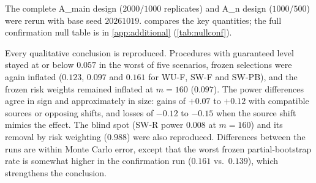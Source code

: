 The complete A\_main design ($2000$/$1000$ replicates) and A\_n design ($1000$/$500$) were rerun with base seed $20261019$.  compares the key quantities; the full confirmation null table is in \cref{app:additional} (\cref{tab:nullconf}).

\begin{table}[H]
\centering\scriptsize
\caption{Key quantities in the exploratory and the independent confirmation runs, with Wilson 95\% intervals (rates) or paired normal 95\% intervals (differences).}\label{tab:confirm}

\end{table}

Every qualitative conclusion is reproduced. Procedures with guaranteed level stayed at or below $0.057$ in the worst of five scenarios, frozen selections were again inflated ($0.123$, $0.097$ and $0.161$ for WU-F, SW-F and SW-PB), and the frozen risk weights remained inflated at $m=160$ ($0.097$). The power differences agree in sign and approximately in size: gains of $+0.07$ to $+0.12$ with compatible sources or opposing shifts, and losses of $-0.12$ to $-0.15$ when the source shift mimics the effect. The blind spot (SW-R power $0.008$ at $m=160$) and its removal by risk weighting ($0.988$) were also reproduced. Differences between the runs are within Monte Carlo error, except that the worst frozen partial-bootstrap rate is somewhat higher in the confirmation run ($0.161$ vs.\ $0.139$), which strengthens the conclusion.
